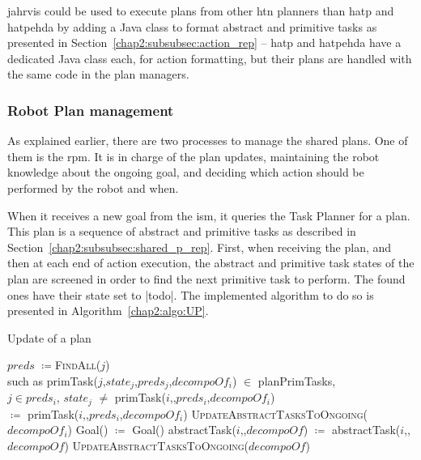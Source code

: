 \documentclass[a4paper,11pt,twoside]{StyleThese}
\begin{document}
\acrshort{jahrvis} could be used to execute plans from other \acrshort{htn} planners than \acrshort{hatp} and \acrshort{hatpehda} by adding a Java class to format abstract and primitive tasks as presented in Section~\ref{chap2:subsubsec:action_rep} -- \acrshort{hatp} and \acrshort{hatpehda} have a dedicated Java class each, for action formatting, but their plans are handled with the same code in the plan managers.


\subsubsection{Robot Plan management}\label{chap2:subsubsec:robot_plan}

As explained earlier, there are two processes to manage the shared plans. One of them is the \acrfull{rpm}. It is in charge of the plan updates, maintaining the robot knowledge about the ongoing goal, and deciding which action should be performed by the robot and when. 

When it receives a new goal from the \acrlong{ism}, it queries the Task Planner for a plan. This plan is a sequence of abstract and primitive tasks as described in Section~\ref{chap2:subsubsec:shared_p_rep}. First, when receiving the plan, and then at each end of action execution, the abstract and primitive task states of the plan are screened in order to find the next primitive task to perform. The found ones have their state set to |todo|. The implemented algorithm to do so is presented in Algorithm~\ref{chap2:algo:UP}. 

\begin{algorithm}[!htb]
	\caption{Update of a plan}
	\label{chap2:algo:UP}
	\begin{algorithmic}
		\State $preds$ $\coloneqq$\textsc{FindAll}($j$) 
		\\\hfill such as primTask($j$,$state_j$,$preds_j$,$decompoOf_i$) $\in$ planPrimTasks,\\ \hfill $j \in preds_i$, $state_j$ $\neq$ 
		\State primTask($i$,,$preds_i$,$decompoOf_i$) 
		\\\hfill $\coloneqq$ primTask($i$,,$preds_i$,$decompoOf_i$)
		\State \textsc{UpdateAbstractTasksToOngoing($decompoOf_i$)}
		\EndIf
		\EndFor
		\State Goal() $\coloneqq$ Goal()
		\EndIf
		\EndFunction
		\Statex
		\State abstractTask($i$,,$decompoOf$) $\coloneqq$ abstractTask($i$,,$decompoOf$)
		\State \textsc{UpdateAbstractTasksToOngoing($decompoOf$)}
		\EndIf
		\EndFunction
	\end{algorithmic}
\end{algorithm}
\end{document}
